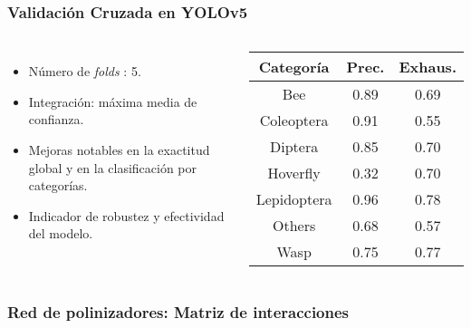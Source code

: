 \begin{frame}
    \frametitle{Validación Cruzada en YOLOv5}
    \vspace*{-1.2cm}
    \begin{columns}
    \begin{itemize}
        \item Número de \textit{folds} : 5.
        \item Integración: máxima media de confianza.
        \item Mejoras notables en la exactitud global y en la clasificación por categorías.
        \item Indicador de robustez y efectividad del modelo.
    \end{itemize}

    \vspace*{-5mm}
    \begin{center}\small
        \begin{tabular}{ccc}
            \toprule
            \textbf{Categoría} & \textbf{Prec.}  &  \textbf{Exhaus.}\\ 
            \midrule
            Bee &           0.89 &  0.69 \\
            Coleoptera &    0.91 &  0.55 \\
            Diptera &       0.85 &  0.70 \\
            Hoverfly &      0.32 &  0.70 \\
            Lepidoptera &   0.96 &  0.78 \\
            Others &        0.68 &  0.57 \\
            Wasp &          0.75 &  0.77 \\
            \bottomrule
        \end{tabular}
    \end{center}
\end{columns}
\end{frame}

\begin{frame}
    \frametitle{Red de polinizadores: Matriz de interacciones}
    \begin{center}
    \end{center}
\end{frame}    

